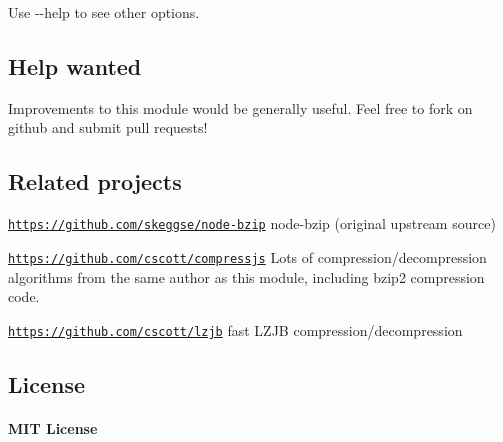 Use {\ttfamily -\/-\/help} to see other options.

\subsection*{Help wanted}

Improvements to this module would be generally useful. Feel free to fork on github and submit pull requests!

\subsection*{Related projects}


\begin{DoxyItemize}
\item \href{https://github.com/skeggse/node-bzip}{\tt https\+://github.\+com/skeggse/node-\/bzip} node-\/bzip (original upstream source)
\item \href{https://github.com/cscott/compressjs}{\tt https\+://github.\+com/cscott/compressjs} Lots of compression/decompression algorithms from the same author as this module, including bzip2 compression code.
\item \href{https://github.com/cscott/lzjb}{\tt https\+://github.\+com/cscott/lzjb} fast L\+Z\+JB compression/decompression
\end{DoxyItemize}

\subsection*{License}

\paragraph*{M\+IT License}

